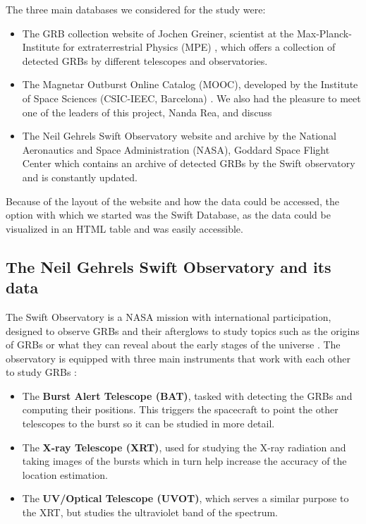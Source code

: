 \documentclass[12pt]{article}
\begin{document}
The three main databases we considered for the study were:

\begin{itemize}
\item The GRB collection website of Jochen Greiner, scientist at the Max-Planck-Institute for extraterrestrial Physics (MPE) \cite{greinergrb},  which offers a collection of detected GRBs by different telescopes and observatories.
\item The Magnetar Outburst Online Catalog (MOOC), developed by the Institute of Space Sciences (CSIC-IEEC, Barcelona) \cite{moocgrbs}. We also had the pleasure to meet one of the leaders of this project, Nanda Rea, and discuss
\item The Neil Gehrels Swift Observatory website and archive by the National Aeronautics and Space Administration (NASA), Goddard Space Flight Center \cite{swiftnasa} which contains an archive of detected GRBs by the Swift observatory and is constantly updated.
\end{itemize}

Because of the layout of the website and how the data could be accessed, the option with which we started was the Swift Database, as the data could be visualized in an HTML table and was easily accessible.

\subsection{The Neil Gehrels Swift Observatory and its data }

The Swift Observatory is a NASA mission with international participation, designed to observe GRBs and their afterglows to study topics such as the origins of GRBs or what they can reveal about the early stages of the universe \cite{roming2005swift}. The observatory is equipped with three main instruments that work with each other to study GRBs \cite{gehrels2004swift} \cite{swiftnasa}:

\begin{itemize}
\item The \textbf{Burst Alert Telescope (BAT)}, tasked with detecting the GRBs and computing their positions. This triggers the spacecraft to point the other telescopes to the burst so it can be studied in more detail. 
\item The \textbf{X-ray Telescope (XRT)}, used for studying the X-ray radiation and taking images of the bursts which in turn help increase the accuracy of the location estimation.
\item The \textbf{UV/Optical Telescope (UVOT)}, which serves a similar purpose to the XRT, but studies the ultraviolet band of the spectrum. 
\end{itemize}
\end{document}
